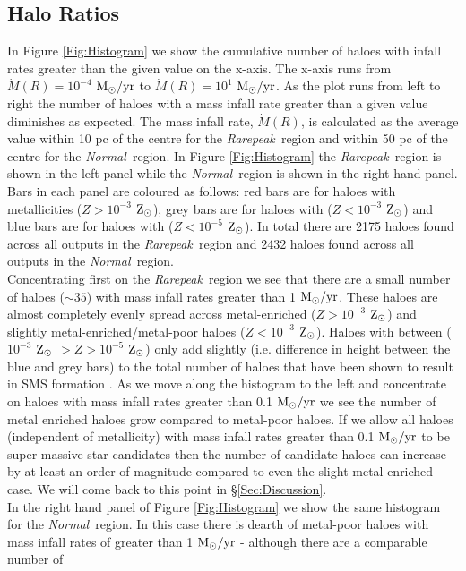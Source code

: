 \documentclass[graphics, twocolumn, usenatbib]{mn2e}
\newcommand{\msolaryr} {$\rm{M_{\odot}/yr}~$}
\newcommand{\msolaryrc} {$\rm{M_{\odot}/yr}$}
\newcommand{\zsolar} {$\rm{Z_{\odot}}~$}
\newcommand{\zsolarc} {$\rm{Z_{\odot}}$}
\newcommand{\rarepeak} {\textit{Rarepeak~}}
\newcommand{\normal} {\textit{Normal~}}
\begin{document}
\subsection{Halo Ratios}
In Figure \ref{Fig:Histogram} we show the cumulative number of haloes with infall rates greater than
the given value on the x-axis. The x-axis runs from $\dot{M}(R) = 10^{-4}$ \msolaryr to 
$\dot{M}(R) = 10^{1}$ \msolaryrc. As the plot runs from left to right the number of haloes with a
mass infall rate greater than a given value diminishes as expected. The mass infall rate,
$\dot{M}(R)$, is calculated as the average value within 10 pc of the centre for the \rarepeak region
and within 50 pc of the centre for the \normal region. In Figure  \ref{Fig:Histogram} the
\rarepeak region is shown in the left panel while the \normal region is shown in the right hand
panel. Bars in each panel are coloured as follows: red bars are for haloes with metallicities
($Z > 10^{-3}$ \zsolarc), grey bars are for haloes with ($Z < 10^{-3}$ \zsolarc) and blue bars are for
haloes with ($Z < 10^{-5}$ \zsolarc). In total there are 2175 haloes found across all outputs in
the \rarepeak region and 2432 haloes found across all outputs in the \normal region. \\
\indent Concentrating first on the \rarepeak region we see that there are a small number of
haloes ($\sim 35$) with mass infall rates greater than 1 \msolaryrc. These haloes are almost
completely evenly spread across metal-enriched ($Z > 10^{-3}$ \zsolarc) and
slightly metal-enriched/metal-poor haloes ($Z < 10^{-3}$ \zsolarc). Haloes with between
($10^{-3}$ \zsolar $> Z > 10^{-5}$ \zsolarc) only add slightly (i.e. difference in height between the
blue and grey bars) to the total number of haloes that
have been shown to result in SMS formation \citep{Chon_2020}. As we move along the histogram to the
left and concentrate on haloes with mass infall rates greater than 0.1 \msolaryr we see the
number of metal enriched haloes grow compared to
metal-poor haloes. If we allow all haloes (independent of metallicity) with mass infall rates greater
than  0.1 \msolaryr to be super-massive star candidates then the number of candidate haloes can
increase by at least an order of magnitude compared to even the slight metal-enriched case. We will
come back to this point in \S \ref{Sec:Discussion}. \\
\indent In the right hand panel of Figure \ref{Fig:Histogram}
we show the same histogram for the \normal region. In this case there is dearth of metal-poor haloes
with mass infall rates of greater than 1 \msolaryr - although there are a comparable number of
\end{document}
